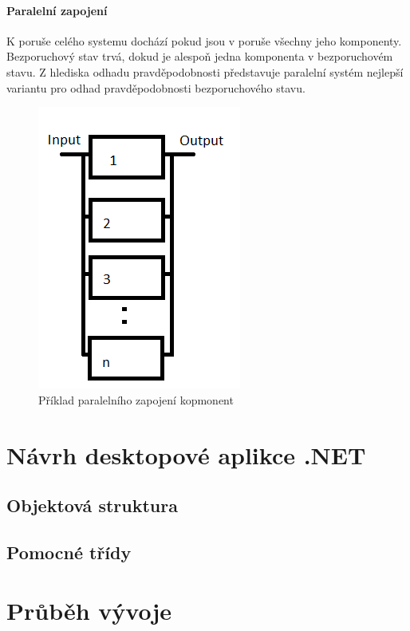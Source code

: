 \documentclass[FM,RP]{tulthesis}
\begin{document}
        \subsubsection*{Paralelní zapojení}
            K poruše celého systemu dochází pokud jsou v poruše všechny jeho komponenty. Bezporuchový stav trvá, dokud je alespoň jedna komponenta v bezporuchovém stavu.
            Z hlediska odhadu pravděpodobnosti představuje paralelní systém nejlepší variantu pro odhad pravděpodobnosti bezporuchového stavu.\cite{5}
            \begin{figure}[h]
                \centering
                \includegraphics[scale=0.75]{pic/paralelni.png}
                \caption{Příklad paralelního zapojení kopmonent} \label{Obrázek č. 2.1}
            \end{figure}

\chapter{Návrh desktopové aplikce .NET}
    \section{Objektová struktura}

    \section{Pomocné třídy}

\chapter{Průběh vývoje}
\end{document}
